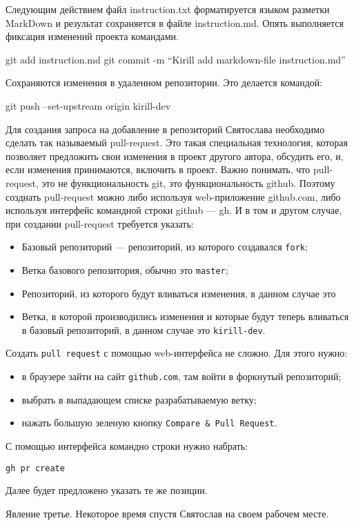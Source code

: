 \documentclass{play}
\begin{document}
Следующим действием файл instruction.txt форматируется языком разметки MarkDown и результат 
сохраняется в файле instruction.md.
Опять выполняется фиксация изменений проекта командами. 

git add instruction.md
git commit -m ``Kirill add markdown-file instruction.md''

Сохраняются изменения в удаленном репозитории. Это делается командой:

git push --set-upstream origin kirill-dev

Для создания запроса на добавление в репозиторий Святослава необходимо сделать так называемый
pull-request. Это такая специальная технология, которая позволяет предложить свои изменения 
в проект другого автора, обсудить его, и, если изменения принимаются, включить в проект.
Важно понимать, что  pull-request, это не функциональность git, это функциональность github.
Поэтому созднать pull-request можно либо используя web-приложение github.com, либо 
используя интерфейс командной строки github --- gh. И в том и другом случае, при создании 
pull-request требуется указать:
\begin{itemize}
	\item Базовый репозиторий --- репозиторий, из которого создавался \texttt{fork};
	\item Ветка базового репозитория, обычно это \texttt{master};
	\item Репозиторий, из которого будут вливаться изменения, в данном случае это
	\item Ветка, в которой производились изменения и которые будут теперь вливаться в 
		базовый репозиторий, в данном случае это \texttt{kirill-dev}.
\end{itemize}
Создать \texttt{pull request} с помощью web-интерфейса не сложно. Для этого нужно:
\begin{itemize}
	\item в браузере зайти на сайт \texttt{github.com}, там войти в форкнутый репозиторий;
	\item выбрать в выпадающем списке разрабатываемую ветку;
	\item нажать большую зеленую кнопку \texttt{Compare \& Pull Request}.
\end{itemize}
С помощью интерфейса командно строки нужно набрать:
\begin{verbatim}
gh pr create
\end{verbatim}
Далее будет предложено указать те же позиции.

Явление третье.
Некоторое время спустя Святослав на своем рабочем месте.
\end{document}
